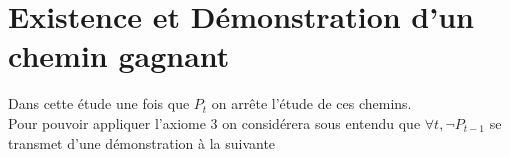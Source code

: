 \documentclass{article}
\begin{document}




\section*{Existence et Démonstration d'un chemin gagnant}

Dans cette étude une fois que $P_t$ on arrête l'étude de ces chemins.\\
Pour pouvoir appliquer l'axiome 3 on considérera sous entendu que $\forall t, \neg P_{t-1}$ se transmet d'une démonstration à la suivante
\end{document}
